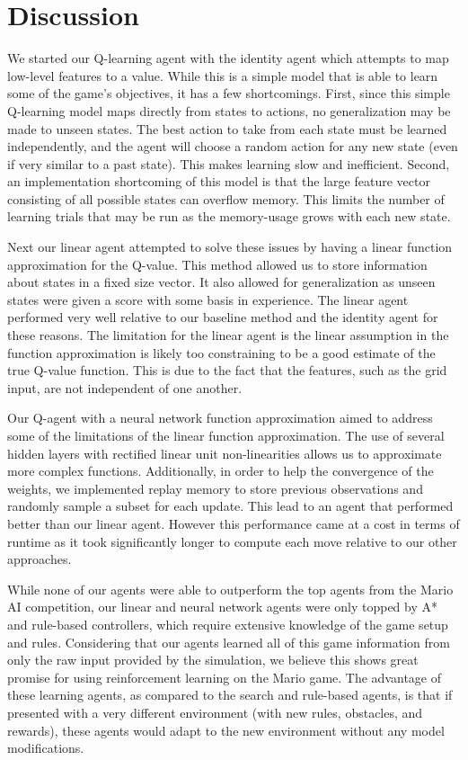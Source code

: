 \documentclass[12pt]{article}
\begin{document}
\section{Discussion}

We started our Q-learning agent with the identity agent which attempts to map low-level features to a value. While this is a simple model that is able to learn some of the game's objectives, it has a few shortcomings. First, since this simple Q-learning model maps directly from states to actions, no generalization may be made to unseen states. The best action to take from each state must be learned independently, and the agent will choose a random action for any new state (even if very similar to a past state). This makes learning slow and inefficient. Second, an implementation shortcoming of this model is that the large feature vector consisting of all possible states can overflow memory. This limits the number of learning trials that may be run as the memory-usage grows with each new state.

Next our linear agent attempted to solve these issues by having a linear function approximation for the Q-value. This method allowed us to store information about states in a fixed size vector. It also allowed for generalization as unseen states were given a score with some basis in experience. The linear agent performed very well relative to our baseline method and the identity agent for these reasons. The limitation for the linear agent is the linear assumption in the function approximation is likely too constraining to be a good estimate of the true Q-value function. This is due to the fact that the features, such as the grid input, are not independent of one another.

Our Q-agent with a neural network function approximation aimed to address some of the limitations of the linear function approximation. The use of several hidden layers with rectified linear unit non-linearities allows us to approximate more complex functions. Additionally, in order to help the convergence of the weights, we implemented replay memory to store previous observations and randomly sample a subset for each update. This lead to an agent that performed better than our linear agent. However this performance came at a cost in terms of runtime as it took significantly longer to compute each move relative to our other approaches.

While none of our agents were able to outperform the top agents from the Mario AI competition, our linear and neural network agents were only topped by A* and rule-based controllers, which require extensive knowledge of the game setup and rules. Considering that our agents learned all of this game information from only the raw input provided by the simulation, we believe this shows great promise for using reinforcement learning on the Mario game. The advantage of these learning agents, as compared to the search and rule-based agents, is that if presented with a very different environment (with new rules, obstacles, and rewards), these agents would adapt to the new environment without any model modifications.


\printbibliography
\end{document}

